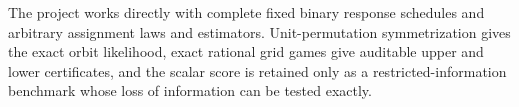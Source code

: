 The project works directly with complete fixed binary response schedules and arbitrary assignment laws and estimators.  Unit-permutation symmetrization gives the exact orbit likelihood, exact rational grid games give auditable upper and lower certificates, and the scalar score is retained only as a restricted-information benchmark whose loss of information can be tested exactly.